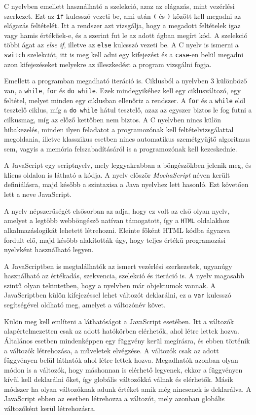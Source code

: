 C nyelvben emellett használható a szelekció, azaz az elágazás, mint vezérlési szerkezet.
Ezt az \texttt{if} kulcsszó vezeti be, ami után \texttt{(} és \texttt{)} között kell megadni az elágazás feltételét.
Itt a rendszer azt vizsgálja, hogy a megadott feltételek igaz vagy hamis értékűek-e, és a szerint fut le az adott ágban megírt kód. A szelekció többi ágat az \textit{else if}, illetve az \texttt{else} kulcsszó vezeti be.
A C nyelv is ismerni a \texttt{switch} szelekciót, itt is meg kell adni egy kifejezést és a \texttt{case}-en belül megadni azon kifejezéseket melyekre az illeszkedést a program vizsgálni fogja.

Emellett a programban megadható iteráció is. Ciklusból a nyelvben 3 különböző van, a \texttt{while}, \texttt{for} és \texttt{do while}. Ezek mindegyikéhez kell egy ciklusváltozó, egy feltétel, melyet minden egy ciklusban ellenőriz a rendszer. A \texttt{for} és a \texttt{while} elöl tesztelő ciklus, míg a \texttt{do while} hátul tesztelő, azaz az egyszer biztos le fog futni a cilkusmag, míg az előző kettőben nem biztos. A C nyelvben nincs külön hibakezelés, minden ilyen feladatot a programozónak kell feltételvizsgálattal megoldania, illetve klasszikus esetben nincs automatikus szemétgyűjtő algoritmus sem, vagyis a memória felszabadításáról is a programozónak kell kezeskednie.


A JavaScript egy scriptnyelv, mely leggyakrabban a böngészőkben jelenik meg, és kliens oldalon is látható a kódja. A nyelv először \textit{MochaScript} néven került definiálásra, majd később a szintaxisa a Java nyelvhez lett hasonló. Ezt követően lett a neve JavaScript.

A nyelv népszerűségét elsősorban az adja, hogy ez volt az első olyan nyelv, amelyet a legtöbb webböngésző natívan támogatott, így a \texttt{HTML} oldalakhoz alkalmazáslogikát lehetett létrehozni. Eleinte főként HTML kódba ágyazva fordult elő, majd később alakították úgy, hogy teljes értékű programozási nyelvként használható legyen.

A JavaScriptben is megtalálhatók az ismert vezérlési szerkezetek, ugyanúgy használható az értékadás, szekvencia, szelekció és iteráció is. A nyelv magasabb szintű olyan tekintetben, hogy a nyelvben már objektumok vannak. A JavaScriptben külön kifejezéssel lehet változót deklarálni, ez a \texttt{var} kulcsszó segítségével oldható meg, amelyet a változónév követ.

Külön meg kell említeni a láthatóságot a JavaScript esetében. Itt a változók alapértelmezetten csak az adott hatókörben elérhetők, ahol létre lettek hozva. Általános esetben mindenképpen egy függvény kerül megírásra, és ebben történik a változók létrehozása, a műveletek elvégzése. A változók csak az adott függvényen belül láthatók ahol létre lettek hozva. Megadhatók azonban olyan módon is a változók, hogy máshonnan is elérhető legyenek, ekkor a függvényen kívül kell deklarálni őket, így globális változókká válnak és elérhetők. Másik módszer ha olyan változóknak adunk értéket amik még nincsenek is deklarálva. A JavaScript ebben az esetben létrehozza a változót, mely azonban globális változóként kerül létrehozásra.

